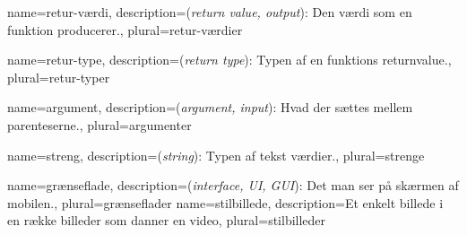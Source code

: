 \usepackage[toc]{glossaries}

\makeglossaries

{
	name={retur-værdi},
	description={(\textit{return value, output}): Den værdi som en funktion 
				 producerer.},
	plural={retur-værdier}
}

{
	name={retur-type},
	description={(\textit{return type}): Typen af en funktions 
				 \gls{returnvalue}.},
	plural={retur-typer}
}

{
	name={argument},
	description={(\textit{argument, input}): Hvad der sættes mellem 
				 parenteserne.},
	plural={argumenter}
}

{
	name={streng},
	description={(\textit{string}): Typen af tekst værdier.},
	plural={strenge}
}

{
	name={grænseflade},
	description={(\textit{interface, UI, GUI}): Det man ser på skærmen af
		 		 mobilen.},
	plural={grænseflader}
}
{
	name={stilbillede},
	description={Et enkelt billede i en række billeder som danner en video},
	plural={stilbilleder}
}